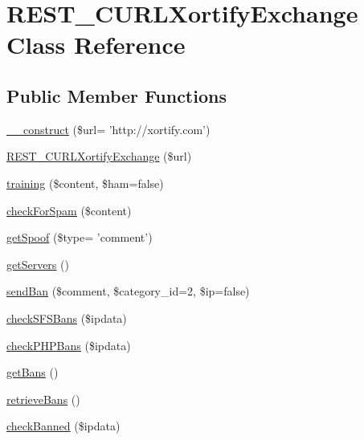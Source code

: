 \hypertarget{class_r_e_s_t___c_u_r_l_xortify_exchange}{\section{R\-E\-S\-T\-\_\-\-C\-U\-R\-L\-Xortify\-Exchange Class Reference}
\label{class_r_e_s_t___c_u_r_l_xortify_exchange}
}
\subsection*{Public Member Functions}
\begin{DoxyCompactItemize}
\item 
\hyperlink{class_r_e_s_t___c_u_r_l_xortify_exchange_a0e33a9b5cea89315431b2d440e576d5f}{\-\_\-\-\_\-construct} (\$url= 'http\-://xortify.\-com')
\item 
\hyperlink{class_r_e_s_t___c_u_r_l_xortify_exchange_a0158f268fc7102a5d426a69dfd806885}{R\-E\-S\-T\-\_\-\-C\-U\-R\-L\-Xortify\-Exchange} (\$url)
\item 
\hyperlink{class_r_e_s_t___c_u_r_l_xortify_exchange_a3b3be735e633ba330c6b5d086aa508cd}{training} (\$content, \$ham=false)
\item 
\hyperlink{class_r_e_s_t___c_u_r_l_xortify_exchange_a7a4f53c3841dc7806455261af557d514}{check\-For\-Spam} (\$content)
\item 
\hyperlink{class_r_e_s_t___c_u_r_l_xortify_exchange_ae7926cba79660f77479306100f492c03}{get\-Spoof} (\$type= 'comment')
\item 
\hyperlink{class_r_e_s_t___c_u_r_l_xortify_exchange_a882f365bc81e207dc2123ef707735e82}{get\-Servers} ()
\item 
\hyperlink{class_r_e_s_t___c_u_r_l_xortify_exchange_a0293acfa4afe0cb5b2816352a35d8ca7}{send\-Ban} (\$comment, \$category\-\_\-id=2, \$ip=false)
\item 
\hyperlink{class_r_e_s_t___c_u_r_l_xortify_exchange_a985a563a84e3e5c54694fcce192bda53}{check\-S\-F\-S\-Bans} (\$ipdata)
\item 
\hyperlink{class_r_e_s_t___c_u_r_l_xortify_exchange_aeb1bf9aaee4718870adbd07333490aaf}{check\-P\-H\-P\-Bans} (\$ipdata)
\item 
\hyperlink{class_r_e_s_t___c_u_r_l_xortify_exchange_aea26db2906896833d32445a698fc4cdc}{get\-Bans} ()
\item 
\hyperlink{class_r_e_s_t___c_u_r_l_xortify_exchange_a4af29af927aae9aada97ef0c2cd08fa1}{retrieve\-Bans} ()
\item 
\hyperlink{class_r_e_s_t___c_u_r_l_xortify_exchange_ae41df0f26620b727f7f63342648f6474}{check\-Banned} (\$ipdata)
\end{DoxyCompactItemize}
